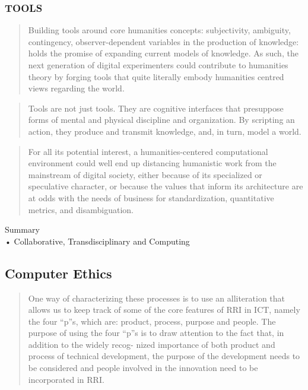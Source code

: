 \subsubsection*{TOOLS}
\begin{quote}
  Building tools around core humanities concepts: subjectivity, ambiguity, contingency, observer-dependent variables in the production of knowledge: holds the promise of expanding current models of knowledge. As such, the next generation of digital experimenters could contribute to humanities theory by forging tools that quite literally embody humanities centred views regarding the world. \autocite[p.104]{Burdick2012}
\end{quote}

\begin{quote}
  Tools are not just tools. They are cognitive interfaces that presuppose forms of mental and physical discipline and organization. By scripting an action, they produce and transmit knowledge, and, in turn, model a world. \autocite[p.105]{Burdick2012}
\end{quote}

\begin{quote}
  For all its potential interest, a humanities-centered computational environment could well end up distancing humanistic work from the mainstream of digital society, either because of its specialized or speculative character, or because the values that inform its architecture are at odds with the needs of business for standardization, quantitative metrics, and disambiguation. \autocite[p.105]{Burdick2012}
\end{quote}

\begin{shaded}
Summary\\
•	Collaborative, Transdisciplinary and Computing
\end{shaded}

\subsection{Computer Ethics}


\begin{quote}
  One way of characterizing these processes is to use an alliteration that allows us to keep track of some of the core features of RRI in ICT, namely the four “p”s, which are: product, process, purpose and people. The purpose of using the four “p”s is to draw attention to the fact that, in addition to the widely recog- nized importance of both product and process of technical development, the purpose of the development needs to be considered and people involved in the innovation need to be incorporated in RRI. \autocite{Stahl2013}
\end{quote}

